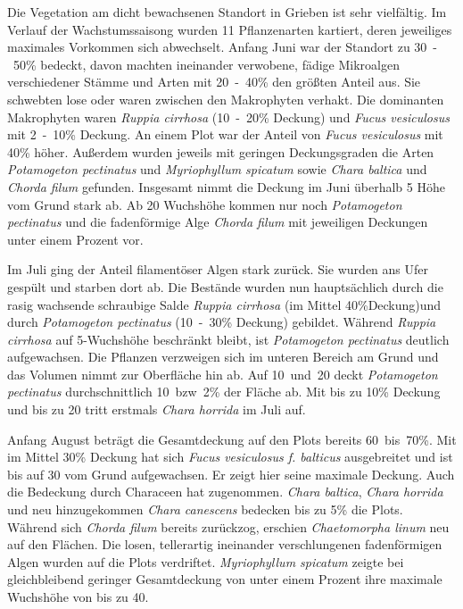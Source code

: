Die Vegetation am dicht bewachsenen Standort in Grieben ist sehr vielfältig. Im Verlauf der Wachstumssaisong wurden 11 Pflanzenarten kartiert, deren jeweiliges maximales Vorkommen sich abwechselt. Anfang Juni war der Standort zu \unit{30-50}{\%} bedeckt, davon machten ineinander verwobene, fädige Mikroalgen verschiedener Stämme und Arten mit \unit{20-40}{\%} den größten Anteil aus. Sie schwebten lose oder waren zwischen den Makrophyten verhakt. Die dominanten Makrophyten waren \textit{Ruppia cirrhosa} (\unit{10-20}{\%} Deckung) und \textit{Fucus vesiculosus} mit \unit{2-10}{\%} Deckung. An einem Plot war der Anteil von \textit{Fucus vesiculosus} mit \unit{40}{\%} höher. Außerdem wurden jeweils mit geringen Deckungsgraden die Arten \textit{Potamogeton pectinatus} und \textit{Myriophyllum spicatum} sowie \textit{Chara baltica} und \textit{Chorda filum} gefunden. Insgesamt nimmt die Deckung im Juni überhalb \unit{5}{\centri\metre} Höhe vom Grund stark ab. Ab \unit{20}{\centi\metre} Wuchshöhe kommen nur noch \textit{Potamogeton pectinatus} und die fadenförmige Alge \textit{Chorda filum} mit jeweiligen Deckungen unter einem Prozent vor.

Im Juli ging der Anteil filamentöser Algen stark zurück. Sie wurden ans Ufer gespült und starben dort ab. Die Bestände wurden nun hauptsächlich durch die rasig wachsende schraubige Salde \textit{Ruppia cirrhosa} (im Mittel \unit{40}{\%}Deckung)und durch \textit{Potamogeton pectinatus} (\unit{10-30}{\%} Deckung) gebildet. Während \textit{Ruppia cirrhosa} auf \unit{5}{\centi\metre}-Wuchshöhe beschränkt bleibt, ist \textit{Potamogeton pectinatus} deutlich aufgewachsen. Die Pflanzen verzweigen sich im unteren Bereich am Grund und das Volumen nimmt zur Oberfläche hin ab. Auf \unit{10 und 20} {\centi\metre} deckt \textit{Potamogeton pectinatus} durchschnittlich \unit{10 bzw. 2}{\%} der Fläche ab. Mit bis zu \unit{10}{\%} Deckung und bis zu \unit{20}{\centi\metre} tritt erstmals \textit{Chara horrida} im Juli auf.

Anfang August beträgt die Gesamtdeckung auf den Plots bereits \unit{60 bis 70}{\%}. Mit im Mittel \unit{30}{\%} Deckung hat sich \textit{Fucus vesiculosus f. balticus} ausgebreitet und ist bis auf \unit{30}{\centi\metre} vom Grund aufgewachsen. Er zeigt hier seine maximale Deckung. Auch die Bedeckung durch Characeen hat zugenommen. \textit{Chara baltica}, \textit{Chara horrida} und neu hinzugekommen \textit{Chara canescens} bedecken bis zu \unit{5}{\%} die Plots. Während sich \textit{Chorda filum} bereits zurückzog, erschien \textit{Chaetomorpha linum} neu auf den Flächen. Die losen, tellerartig ineinander verschlungenen fadenförmigen Algen wurden auf die Plots verdriftet. \textit{Myriophyllum spicatum} zeigte bei gleichbleibend geringer Gesamtdeckung von unter einem Prozent ihre maximale Wuchshöhe von bis zu \unit{40}{\centi\metre}.

